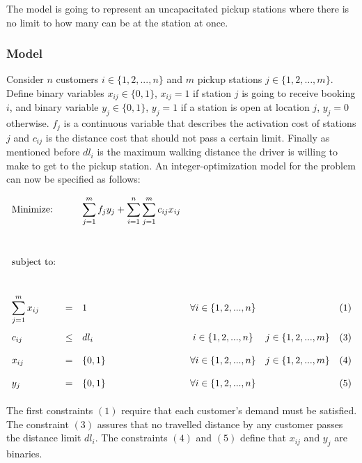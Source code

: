 \documentclass{article}
\begin{document}
The model is going to represent an uncapacitated  pickup stations where there is no limit to how many can be at the station at once.


\subsubsection{Model}
\label{subsection:model_partI}

Consider $n$ customers $i \in \{1,2,...,n\}$ and $m$ pickup stations $ j \in \{1,2,…,m\}$. Define binary variables $x_{ij} \in \{0, 1\}$,  $x_{ij} = 1$ if station $j$ is going to receive booking $i$, 
and binary variable $y_{j} \in \{0,1\}$, $y_{j}= 1$ if a station is open at location $j$, $y_{j}=0$ otherwise. $f_j$ is a continuous variable that describes the activation cost of stations $j$ and $c_{ij}$ is the distance cost that should not pass a certain limit.
Finally as mentioned before $dl_i$ is the maximum walking distance the driver is willing to make to get to the pickup station.
 An integer-optimization model for the problem can now be specified as follows:


\begin{equation*}
\def\arraystretch{2}
\begin{array}{lllcll} %
\text{Minimize:}  && \displaystyle\sum\limits_{j=1}^{m}f_{j} y_{j} + \sum\limits_{i=1}^{n}\sum\limits_{j=1}^{m}c_{ij}x_{ij} && & \\
	&	&	&	&	&  \\
\text{subject to:}&   &  &  & &\\
	&	&	& 	&	& \\
	 \displaystyle\sum\limits_{j=1}^{m}x_{ij} &=& 1 &  \forall i \in \{1,2,...,n\} & & (1) \\  
	 c_{ij} &\leq& dl_i &  i \in \{1,2,...,n\} &j \in \{1,2,...,m\}  & (3) \\ 
	 x_{ij} &=& \{0,1\} &  \forall  i \in \{1,2,...,n\} &j \in \{1,2,...,m\} & (4) \\ 
	 y_{j} &=& \{0,1\} &  \forall i \in \{1,2,...,n\} & & (5) \\ 
\end{array}
\end{equation*}

The first constraints $(1)$ require that each customer’s demand must be satisfied.%
The constraint $(3)$ assures that no travelled distance by any customer passes the distance limit $dl_i$. The constraints $(4)$ and $(5)$ define that $x_{ij}$ and $y_j$ are binaries.
\end{document}
